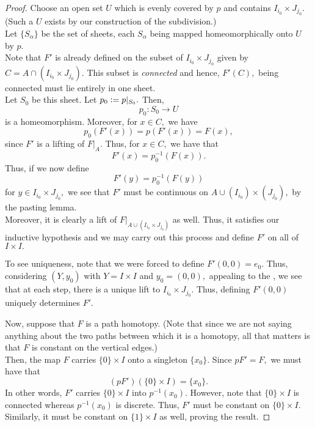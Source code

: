 \documentclass[12pt]{article}
\theoremstyle{definition}
\numberwithin{thm}{section}
\begin{document}
\begin{proof}
	Choose an open set $U$ which is evenly covered by $p$ and contains $I_{i_0} \times J_{j_0}.$ (Such a $U$ exists by our construction of the subdivision.)\\
	Let $\{S_\alpha\}$ be the set of sheets, each $S_\alpha$ being mapped homeomorphically onto $U$ by $p.$\\
	Note that $F'$ is already defined on the subset of $I_{i_0} \times J_{j_0}$ given by $C = A \cap (I_{i_0} \times J_{j_0}).$ This subset is \emph{connected} and hence, $F'(C),$ being connected must lie entirely in one sheet.\\
	Let $S_0$ be this sheet. Let $p_0 \vcentcolon= p|_{S_0}.$ Then,
	\begin{equation*} 
		p_0 : S_0 \to U
	\end{equation*}
	is a homeomorphism. Moreover, for $x \in C,$ we have
	\begin{equation*} 
		p_0(F'(x)) = p(F'(x)) = F(x),
	\end{equation*}
	since $F'$ is a lifting of $F|_A.$ Thus, for $x \in C,$ we have that
	\begin{equation*} 
		F'(x) = p_0^{-1}(F(x)).
	\end{equation*}
	Thus, if we now define
	\begin{equation*} 
		F'(y) = p_0^{-1}(F(y))
	\end{equation*}
	for $y \in I_{i_0} \times J_{j_0},$ we see that $F'$ must be continuous on $A \cup (I_{i_0}) \times (J_{j_0}),$ by the pasting lemma.\\
	Moreover, it is clearly a lift of $F|_{A \cup (I_{i_0} \times J_{j_0})}$ as well. Thus, it satisfies our inductive hypothesis and we may carry out this process and define $F'$ on all of $I \times I.$

	To see uniqueness, note that we were forced to define $F'(0, 0) = e_0.$ Thus, considering $(Y, y_0)$ with $Y = I \times I$ and $y_0 = (0, 0),$ appealing to the , we see that at each step, there is a unique lift to $I_{i_0} \times J_{j_0}.$ Thus, defining $F'(0, 0)$ uniquely determines $F'.$

	Now, suppose that $F$ is a path homotopy. (Note that since we are not saying anything about the two paths between which it is a homotopy, all that matters is that $F$ is constant on the vertical edges.)\\
	Then, the map $F$ carries $\{0\} \times I$ onto a singleton $\{x_0\}.$ Since $pF' = F,$ we must have that
	\begin{equation*} 
		(pF')(\{0\} \times I) = \{x_0\}.
	\end{equation*}
	In other words, $F'$ carries $\{0\} \times I$ into $p^{-1}(x_0).$ However, note that $\{0\} \times I$ is connected whereas $p^{-1}(x_0)$ is discrete. Thus, $F'$ must be constant on $\{0\} \times I.$\\
	Similarly, it must be constant on $\{1\} \times I$ as well, proving the result.
\end{proof}
\end{document}
